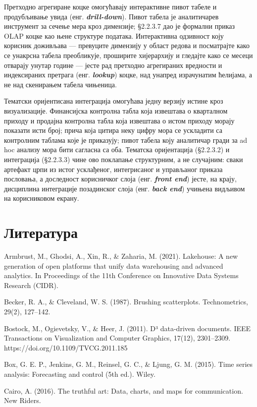 Претходно агрегиране коцке омогућавају интерактивне пивот табеле и продубљивање увида (енг. \textbf{\textit{drill-down}}). Пивот табела је аналитичарев инструмент за сечење мера кроз димензије; §2.2.3.7 дао је формални приказ OLAP коцке као њене структуре података. Интерактивна одзивност коју корисник доживљава — превуците димензију у област редова и посматрајте како се унакрсна табела преобликује, проширите хијерархију и гледајте како се месеци отварају унутар године — јесте рад претходно агрегираних вредности и индексираних претрага (енг. \textbf{\textit{lookup}}) коцке, над унапред израчунатим ћелијама, а не над скенирањем табела чињеница.

Тематски оријентисана интеграција омогућава једну верзију истине кроз визуализације. Финансијска контролна табла која извештава о кварталном приходу и продајна контролна табла која извештава о истом приходу морају показати исти број; прича која цитира неку цифру мора се ускладити са контролним таблама које је приказују; пивот табела коју аналитичар гради за ad hoc анализу мора бити сагласна са оба. Тематска оријентација (§2.2.3.2) и интеграција (§2.2.3.3) чине ово поклапање структурним, а не случајним: сваки артефакт црпи из истог усклађеног, интегрисаног и управљаног приказа пословања, а доследност корисничког слоја (енг. \textbf{\textit{front end}}) јесте, на крају, дисциплина интеграције позадинског слоја (енг. \textbf{\textit{back end}}) учињена видљивом на корисниковом екрану.

\section{Литература}
Armbrust, M., Ghodsi, A., Xin, R., \& Zaharia, M. (2021). Lakehouse: A new generation of open platforms that unify data warehousing and advanced analytics. In Proceedings of the 11th Conference on Innovative Data Systems Research (CIDR).

Becker, R. A., \& Cleveland, W. S. (1987). Brushing scatterplots. Technometrics, 29(2), 127–142.

Bostock, M., Ogievetsky, V., \& Heer, J. (2011). D³ data-driven documents. IEEE Transactions on Visualization and Computer Graphics, 17(12), 2301–2309. https://doi.org/10.1109/TVCG.2011.185

Box, G. E. P., Jenkins, G. M., Reinsel, G. C., \& Ljung, G. M. (2015). Time series analysis: Forecasting and control (5th ed.). Wiley.

Cairo, A. (2016). The truthful art: Data, charts, and maps for communication. New Riders.

